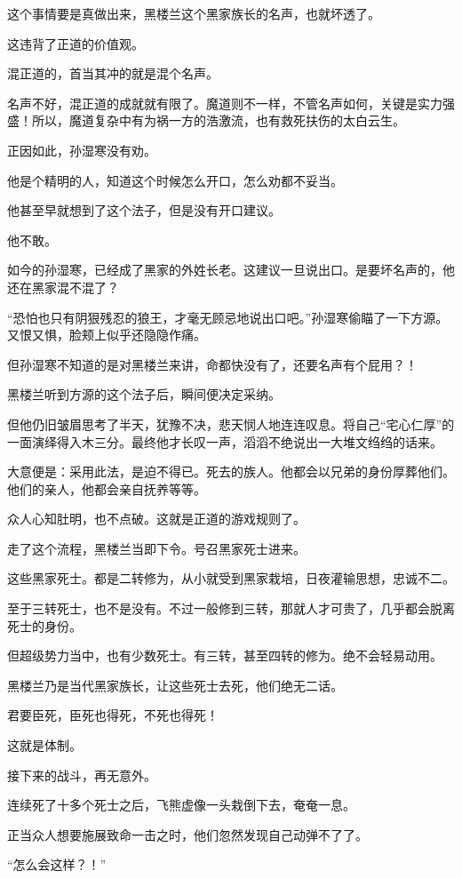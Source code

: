 \begin{this_body}
这个事情要是真做出来，黑楼兰这个黑家族长的名声，也就坏透了。

这违背了正道的价值观。

混正道的，首当其冲的就是混个名声。

名声不好，混正道的成就就有限了。魔道则不一样，不管名声如何，关键是实力强盛！所以，魔道复杂中有为祸一方的浩激流，也有救死扶伤的太白云生。

正因如此，孙湿寒没有劝。

他是个精明的人，知道这个时候怎么开口，怎么劝都不妥当。

他甚至早就想到了这个法子，但是没有开口建议。

他不敢。

如今的孙湿寒，已经成了黑家的外姓长老。这建议一旦说出口。是要坏名声的，他还在黑家混不混了？

“恐怕也只有阴狠残忍的狼王，才毫无顾忌地说出口吧。”孙湿寒偷瞄了一下方源。又恨又惧，脸颊上似乎还隐隐作痛。

但孙湿寒不知道的是对黑楼兰来讲，命都快没有了，还要名声有个屁用？！

黑楼兰听到方源的这个法子后，瞬间便决定采纳。

但他仍旧皱眉思考了半天，犹豫不决，悲天悯人地连连叹息。将自己“宅心仁厚”的一面演绎得入木三分。最终他才长叹一声，滔滔不绝说出一大堆文绉绉的话来。

大意便是：采用此法，是迫不得已。死去的族人。他都会以兄弟的身份厚葬他们。他们的亲人，他都会亲自抚养等等。

众人心知肚明，也不点破。这就是正道的游戏规则了。

走了这个流程，黑楼兰当即下令。号召黑家死士进来。

这些黑家死士。都是二转修为，从小就受到黑家栽培，日夜灌输思想，忠诚不二。

至于三转死士，也不是没有。不过一般修到三转，那就人才可贵了，几乎都会脱离死士的身份。

但超级势力当中，也有少数死士。有三转，甚至四转的修为。绝不会轻易动用。

黑楼兰乃是当代黑家族长，让这些死士去死，他们绝无二话。

君要臣死，臣死也得死，不死也得死！

这就是体制。

接下来的战斗，再无意外。

连续死了十多个死士之后，飞熊虚像一头栽倒下去，奄奄一息。

正当众人想要施展致命一击之时，他们忽然发现自己动弹不了了。

“怎么会这样？！”


\end{this_body}

